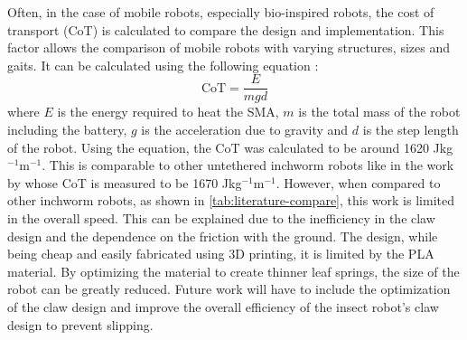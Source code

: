 Often, in the case of mobile robots, especially bio-inspired robots, the cost of transport (CoT) is calculated to compare the design and implementation. This factor allows the comparison of mobile robots with varying structures, sizes and gaits. It can be calculated using the following equation :
\begin{equation}\label{eq:CoT}
    \textrm{CoT} = \frac{E}{mgd}
\end{equation}
where $E$ is the energy required to heat the SMA, $m$ is the total mass of the robot including the battery, $g$ is the acceleration due to gravity and $d$ is the step length of the robot. Using the equation, the CoT was calculated to be around 1620 Jkg$^{-1}$m$^{-1}$. This is comparable to other untethered inchworm robots like in the work by \cite{jiAutonomousUntetheredFast2019} whose CoT is measured to be 1670 Jkg$^{-1}$m$^{-1}$. However, when compared to other inchworm robots, as shown in \cref{tab:literature-compare}, this work is limited in the overall speed. This can be explained due to the inefficiency in the claw design and the dependence on the friction with the ground. The design, while being cheap and easily fabricated using 3D printing, it is limited by the PLA material. By optimizing the material to create thinner leaf springs, the size of the robot can be greatly reduced. Future work will have to include the optimization of the claw design and improve the overall efficiency of the insect robot's claw design to prevent slipping.


